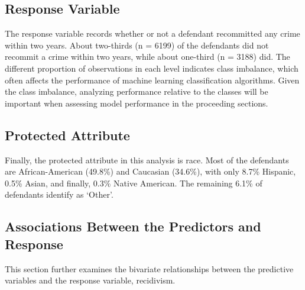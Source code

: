 \documentclass[12pt, twoside]{amherstthesis}
\begin{document}
\hypertarget{response}{%
\subsection{Response Variable}\label{response}}

The response variable records whether or not a defendant recommitted any crime within two years. About two-thirds (n = 6199) of the defendants did not recommit a crime within two years, while about one-third (n = 3188) did. The different proportion of observations in each level indicates class imbalance, which often affects the performance of machine learning classification algorithms. Given the class imbalance, analyzing performance relative to the classes will be important when assessing model performance in the proceeding sections.

\hypertarget{protectedattribute}{%
\subsection{Protected Attribute}\label{protectedattribute}}

Finally, the protected attribute in this analysis is race. Most of the defendants are African-American (49.8\%) and Caucasian (34.6\%), with only 8.7\% Hispanic, 0.5\% Asian, and finally, 0.3\% Native American. The remaining 6.1\% of defendants identify as `Other'.

\hypertarget{bivariateanalysis}{%
\subsection{Associations Between the Predictors and Response}\label{bivariateanalysis}}

This section further examines the bivariate relationships between the predictive variables and the response variable, recidivism.
\end{document}
